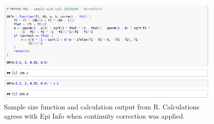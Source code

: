 \documentclass[11pt,twocolumn]{article}
\begin{document}
\begin{figure}[h!]
	\centering
	\includegraphics[scale=0.6]{samplesizecalc.jpg}
	\caption{Sample size function and calculation output from R. Calculations agrees with Epi Info when continuity correction was applied.}
	\label{fig:samplesizecalc}
\end{figure}

\clearpage


\end{document}

